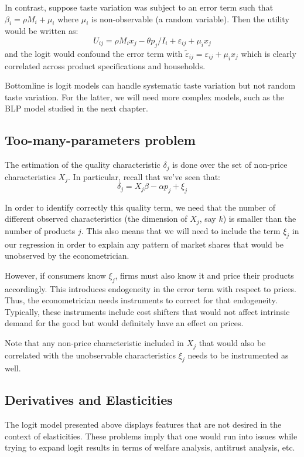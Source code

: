 \documentclass[12pt]{report}
\begin{document}
In contrast, suppose taste variation was subject to an error term such that $\beta_i = \rho M_i + \mu_i$ where $\mu_i$ is non-observable (a random variable). Then the utility would be written as: $$U_{ij} = \rho M_i x_j - \theta p_j/I_i + \varepsilon_{ij} + \mu_ix_j $$ and the logit would confound the error term with $\tilde\varepsilon_{ij} = \varepsilon_{ij} + \mu_ix_j$ which is clearly correlated across product specifications and households.

Bottomline is logit models can handle systematic taste variation but not random taste variation. For the latter, we will need more complex models, such as the BLP model studied in the next chapter.

\subsection{Too-many-parameters problem}

The estimation of the quality characteristic $\delta_j$ is done over the set of non-price characteristics $X_j$. In particular, recall that we've seen that:
$$ \delta_j = X_j\beta - \alpha p_j + \xi_j $$ 

In order to identify correctly this quality term, we need that the number of different observed characteristics (the dimension of $X_j$, say $k$) is smaller than the number of products $j$. This also means that we will need to include the term $\xi_j$ in our regression in order to explain any pattern of market shares that would be unobserved by the econometrician.

However, if consumers know $\xi_j$, firms must also know it and price their products accordingly. This introduces endogeneity in the error term with respect to prices. Thus, the econometrician needs instruments to correct for that endogeneity. Typically, these instruments include cost shifters that would not affect intrinsic demand for the good but would definitely have an effect on prices.

Note that any non-price characteristic included in $X_j$ that would also be correlated with the unobservable characteristics $\xi_j$ needs to be instrumented as well.

\subsection{Derivatives and Elasticities}

The logit model presented above displays features that are not desired in the context of elasticities. These problems imply that one would run into issues while trying to expand logit results in terms of welfare analysis, antitrust analysis, etc.
\end{document}
